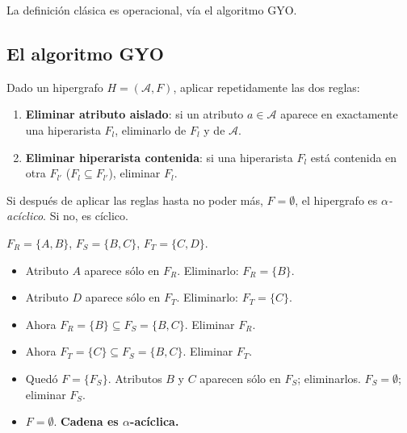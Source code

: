 La definición clásica es operacional, vía el algoritmo GYO.

\subsection{El algoritmo GYO}

\begin{definition}
Dado un hipergrafo \(H = (\mathcal{A}, F)\), aplicar repetidamente
las dos reglas:

\begin{enumerate}
    \item \textbf{Eliminar atributo aislado}: si un atributo
    \(a \in \mathcal{A}\) aparece en exactamente una hiperarista
    \(F_l\), eliminarlo de \(F_l\) y de \(\mathcal{A}\).
    \item \textbf{Eliminar hiperarista contenida}: si una hiperarista
    \(F_l\) está contenida en otra \(F_{l'}\) (\(F_l \subseteq
    F_{l'}\)), eliminar \(F_l\).
\end{enumerate}

Si después de aplicar las reglas hasta no poder más, \(F = \emptyset\),
el hipergrafo es \emph{\(\alpha\)-acíclico}. Si no, es cíclico.
\end{definition}

\begin{ejemplo}
\(F_R = \{A, B\}\), \(F_S = \{B, C\}\), \(F_T = \{C, D\}\).

\begin{itemize}
    \item Atributo \(A\) aparece sólo en \(F_R\). Eliminarlo:
    \(F_R = \{B\}\).
    \item Atributo \(D\) aparece sólo en \(F_T\). Eliminarlo:
    \(F_T = \{C\}\).
    \item Ahora \(F_R = \{B\} \subseteq F_S = \{B, C\}\). Eliminar
    \(F_R\).
    \item Ahora \(F_T = \{C\} \subseteq F_S = \{B, C\}\). Eliminar
    \(F_T\).
    \item Quedó \(F = \{F_S\}\). Atributos \(B\) y \(C\) aparecen
    sólo en \(F_S\); eliminarlos. \(F_S = \emptyset\); eliminar
    \(F_S\).
    \item \(F = \emptyset\). \textbf{Cadena es \(\alpha\)-acíclica.}
\end{itemize}
\end{ejemplo}

